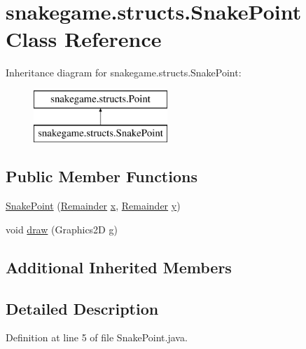 \hypertarget{classsnakegame_1_1structs_1_1_snake_point}{}\section{snakegame.\+structs.\+Snake\+Point Class Reference}
\label{classsnakegame_1_1structs_1_1_snake_point}
Inheritance diagram for snakegame.\+structs.\+Snake\+Point\+:\begin{figure}[H]
\begin{center}
\leavevmode
\includegraphics[height=2.000000cm]{classsnakegame_1_1structs_1_1_snake_point}
\end{center}
\end{figure}
\subsection*{Public Member Functions}
\begin{DoxyCompactItemize}
\item 
\mbox{\hyperlink{classsnakegame_1_1structs_1_1_snake_point_ae366301b429df98a08689c778a097d7c}{Snake\+Point}} (\mbox{\hyperlink{classsnakegame_1_1structs_1_1_remainder}{Remainder}} \mbox{\hyperlink{classsnakegame_1_1structs_1_1_point_acf6c91ee7cda0e65a8054ff0dc07b79a}{x}}, \mbox{\hyperlink{classsnakegame_1_1structs_1_1_remainder}{Remainder}} \mbox{\hyperlink{classsnakegame_1_1structs_1_1_point_a2a9fe55d9cf57dbc120bbce39313d38d}{y}})
\item 
void \mbox{\hyperlink{classsnakegame_1_1structs_1_1_snake_point_aa226b89f8a362d365d5f1d1b522aabaf}{draw}} (Graphics2D g)
\end{DoxyCompactItemize}
\subsection*{Additional Inherited Members}


\subsection{Detailed Description}


Definition at line 5 of file Snake\+Point.\+java.



